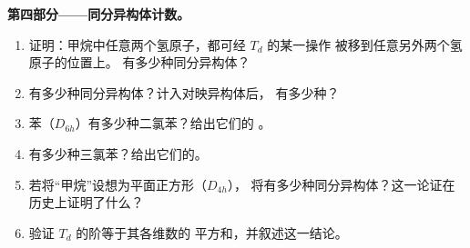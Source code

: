 \begin{problem}
\medskip\noindent\textbf{第四部分——同分异构体计数。}
\begin{enumerate}[resume]
  \item 证明：甲烷中任意两个氢原子，都可经 $T_d$ 的某一操作
        被移到任意另外两个氢原子的位置上。 有多少种同分异构体？
  \item {} 有多少种同分异构体？计入对映异构体后， 有多少种？
  \item 苯（$D_{6h}$）有多少种二氯苯？给出它们的
        。
  \item 有多少种三氯苯？给出它们的。
  \item 若将“甲烷”设想为平面正方形（$D_{4h}$），
         将有多少种同分异构体？这一论证在历史上证明了什么？
  \item 验证 $T_d$ 的阶等于其各维数的
        平方和，并叙述这一结论。
\end{enumerate}
\end{problem}
